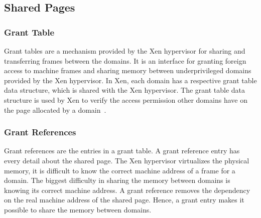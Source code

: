 \subsection*{Shared Pages}
\label{subsec:sharedpages}
\subsubsection*{Grant Table} 
Grant tables are a mechanism provided by the Xen hypervisor for sharing and transferring frames between the domains. It is an interface for granting foreign access to machine frames and sharing memory between underprivileged domains provided by the Xen hypervisor. In Xen, each domain has a respective grant table data structure, which is shared with the Xen hypervisor. The grant table data structure is used by Xen to verify the access permission other domains have on the page allocated by a domain~\cite{granttable}.

\subsubsection*{Grant References}
Grant references are the entries in a grant table. A grant reference entry has every detail about the shared page. The Xen hypervisor virtualizes the physical memory, it is difficult to know the correct machine address of a frame for a domain. The biggest difficulty in sharing the memory between domains is knowing its correct machine address. A grant reference removes the dependency on the real machine address of the shared page. Hence, a grant entry makes it possible to share the memory between domains.\cite{Chisnall:2007:DGX:1407351, barham2003xen, granttable} 

